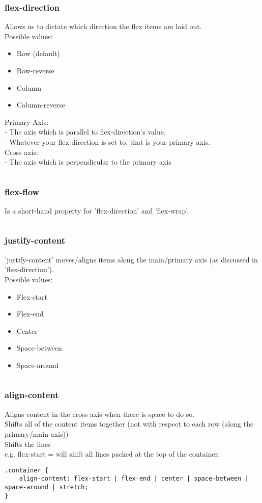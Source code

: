 \documentclass[]{article}
\newcommand{\<}{\guilsinglleft}
\renewcommand{\>}{\guilsinglright}
\begin{document}
\subsubsection{flex-direction}
Allows us to dictate which direction the flex items are laid out.
\\
Possible values:
\begin{itemize}
	\item Row (default)
	\item Row-reverse
	\item Column
	\item Column-reverse
\end{itemize}
Primary Axis:\\
 - The axis which is parallel to flex-direction’s value.\\
 - Whatever your flex-direction is set to, that is your primary axis.
 \\
Cross axis:\\
 - The axis which is perpendicular to the primary axis
\\
\begin{lstlisting}
\end{lstlisting}

\subsubsection{flex-flow}
Is a short-hand property for 'flex-direction' and 'flex-wrap'.
\begin{lstlisting}
\end{lstlisting}

\subsubsection{justify-content}
'justify-content' moves/aligns items along the main/primary axis (as discussed in 'flex-direction').
\\
Possible values:
\begin{itemize}
	\item Flex-start
	\item Flex-end
	\item Center
	\item Space-between
	\item Space-around
\end{itemize}
\begin{lstlisting}
\end{lstlisting}

\subsubsection{align-content}
Aligns content in the cross axis when there is space to do so. 
\\
Shifts all of the content items together (not with respect to each row (along the primary/main axis))
\\
Shifts the lines 
\\
e.g. flex-start = will shift all lines packed at the top of the container.
\begin{lstlisting}
.container {
	align-content: flex-start | flex-end | center | space-between | space-around | stretch;
}
\end{lstlisting}
\end{document}
